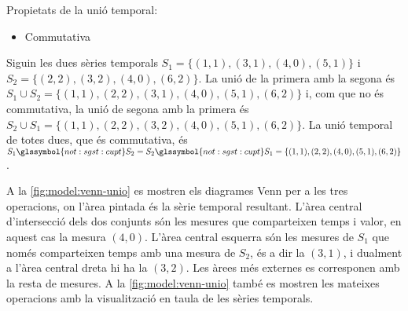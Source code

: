 Propietats de la unió temporal:
\begin{itemize}
\item Commutativa
\end{itemize}




\begin{example}
  Siguin les dues sèries temporals $S_1=\{(1,1),(3,1),(4,0),(5,1)\}$ i
  $S_2=\{(2,2),(3,2),(4,0),(6,2)\}$.  La unió de la primera amb la
  segona és $S_1 \cup S_2 = \{(1,1),(2,2), (3,1), (4,0),(5,1),(6,2)\}$
  i, com que no és commutativa, la unió de segona amb la primera és
  $S_2 \cup S_1 = \{(1,1),(2,2), (3,2), (4,0),(5,1),(6,2)\}$. La unió
  temporal de totes dues, que és commutativa, és $S_1
  \glssymbol{not:sgst:cupt} S_2 = S_2 \glssymbol{not:sgst:cupt} S_1 =
  \{(1,1),(2,2),(4,0),(5,1),(6,2)\}$. %

  A la \autoref{fig:model:venn-unio} es mostren els diagrames Venn per
  a les tres operacions, on l'àrea pintada és la sèrie temporal
  resultant. L'àrea central d'intersecció dels dos conjunts són les
  mesures que comparteixen temps i valor, en aquest cas la mesura
  $(4,0)$. L'àrea central esquerra són les mesures de $S_1$ que només
  comparteixen temps amb una mesura de $S_2$, és a dir la $(3,1)$, i
  dualment a l'àrea central dreta hi ha la $(3,2)$. Les àrees més
  externes es corresponen amb la resta de mesures.  A la
  \autoref{fig:model:venn-unio} també es mostren les mateixes
  operacions amb la visualització en taula de les sèries temporals.

  \begin{figure}
    \centering 
    


\end{figure}
\end{example}
